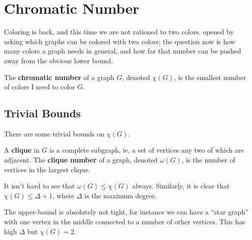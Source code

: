 \section{Chromatic Number}

Coloring is back, and this time we are not rationed to two colors.  opened by asking which graphs can be colored with two colors; the question now is how many colors a graph needs in general, and how far that number can be pushed away from the obvious lower bound.

\begin{boxdefinition}
    The \textbf{chromatic number} of a graph $G$, denoted $\chi(G)$, is the smallest number of colors I need to color $G$.
\end{boxdefinition}

\subsection{Trivial Bounds}

There are some trivial bounds on $\chi(G)$.

\begin{boxdefinition}[Clique]
    A \textbf{clique} in $G$ is a complete subgraph, ie, a set of vertices any two of which are adjacent. The \textbf{clique number} of a graph, denoted $\omega(G)$, is the number of vertices in the largest clique.
\end{boxdefinition}

It isn't hard to see that $\omega(G) \leq \chi(G)$ always. Similarly, it is clear that $\chi(G) \leq \Delta + 1$, where $\Delta$ is the maximum degree.

The upper-bound is absolutely not tight, for instance we can have a ``star graph'' with one vertex in the middle connected to a number of other vertices. This has high $\Delta$ but $\chi(G) = 2$.

\begin{figure}[H]
    \centering
\end{figure}

